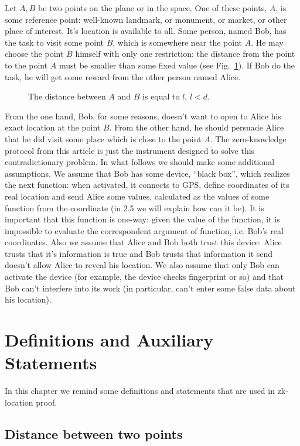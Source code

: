 \documentclass{article}
\begin{document}
Let $A, B$ be two points on the plane or in the space.
One of these points, $A$, is some reference point: well-known landmark, or monument, or market, or other place of interest.
It’s location is available to all.
Some person, named Bob, has the task to visit some point $B$, which is somewhere near the point $A$.
He may choose the point $B$ himself with only one restriction: the distance from the point      
to the point $A$ must be smaller than some fixed value (see Fig.~\ref{fig-1}).
If Bob do the task, he will get some reward from the other person named Alice.
\begin{figure}
  \centering
  \def\svgwidth{\columnwidth}
%  
\caption{The distance between $A$ and $B$ is equal to $l$, $l < d$.}
\label{fig-1}
\end{figure}
%
From the one hand, Bob, for some reasons, doesn’t want to open to Alice his exact location at the point $B$.
From the other hand, he should persuade Alice that he did visit some place which is close to the point $A$.
The zero-knowledge protocol from this article is just the instrument designed to solve this contradictionary problem.
In what follows we should make some additional assumptions.
We assume that Bob has some device, “black box”, which realizes the next function: when activated, it connects to GPS,
define coordinates of its real location and send Alice some values, calculated as the values of some function from the coordinate (in 2.5 we will explain how can it be).
It is important that this function is one-way: given the value of the function, it is impossible to evaluate the correspondent argument of function, i.e. Bob’s real coordinates.
Also we assume that Alice and Bob both trust this device: Alice trusts that it’s information is true and Bob trusts that information it send doesn’t allow Alice to reveal his location.
We also assume that only Bob can activate the device (for example, the device checks fingerprint or so) and that Bob can’t interfere into its work (in particular,
can’t enter some false data about his location).

\section{Definitions and Auxiliary Statements}

In this chapter we remind some definitions and statements that are used in zk-location proof.

\subsection{Distance between two points}  %
\end{document}
